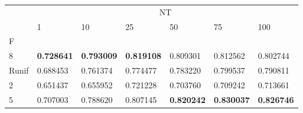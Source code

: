\begin{table}[htbp]
\centering
\label{heart-results}
\begin{tabular}{lllllll}
\toprule
 & \multicolumn{6}{c}{NT} \\
 & 1 & 10 & 25 & 50 & 75 & 100 \\
F &  &  &  &  &  &  \\
\midrule
8 & \textbf{0.728641} & \textbf{0.793009} & \textbf{0.819108} & 0.809301 & 0.812562 & 0.802744 \\
Runif & 0.688453 & 0.761374 & 0.774477 & 0.783220 & 0.799537 & 0.790811 \\
2 & 0.651437 & 0.655952 & 0.721228 & 0.703760 & 0.709242 & 0.713661 \\
5 & 0.707003 & 0.788620 & 0.807145 & \textbf{0.820242} & \textbf{0.830037} & \textbf{0.826746} \\
\bottomrule
\end{tabular}
\end{table}

